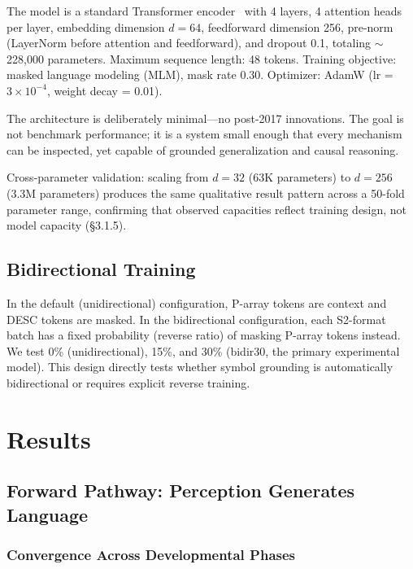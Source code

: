 \documentclass{article}
\begin{document}
The model is a standard Transformer encoder~\cite{vaswani2017} with 4 layers, 4 attention heads per layer, embedding dimension $d = 64$, feedforward dimension 256, pre-norm (LayerNorm before attention and feedforward), and dropout 0.1, totaling $\sim$228,000 parameters. Maximum sequence length: 48 tokens. Training objective: masked language modeling (MLM), mask rate 0.30. Optimizer: AdamW (lr = $3 \times 10^{-4}$, weight decay = 0.01).

The architecture is deliberately minimal---no post-2017 innovations. The goal is not benchmark performance; it is a system small enough that every mechanism can be inspected, yet capable of grounded generalization and causal reasoning.

Cross-parameter validation: scaling from $d = 32$ (63K parameters) to $d = 256$ (3.3M parameters) produces the same qualitative result pattern across a 50-fold parameter range, confirming that observed capacities reflect training design, not model capacity (\S3.1.5).

\subsection{Bidirectional Training}

In the default (unidirectional) configuration, P-array tokens are context and DESC tokens are masked. In the bidirectional configuration, each S2-format batch has a fixed probability (reverse ratio) of masking P-array tokens instead. We test 0\% (unidirectional), 15\%, and 30\% (bidir30, the primary experimental model). This design directly tests whether symbol grounding is automatically bidirectional or requires explicit reverse training.

\section{Results}

\subsection{Forward Pathway: Perception Generates Language}

\subsubsection{Convergence Across Developmental Phases}
\end{document}
